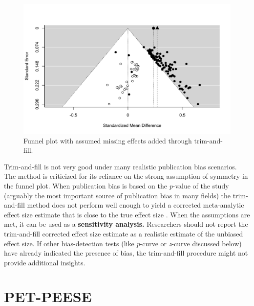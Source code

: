 \documentclass[
  oneside]{krantz}
\begin{document}
\begin{figure}

{\centering \includegraphics[width=1\linewidth]{12-bias_files/figure-latex/trimfill1-1} 

}

\caption{Funnel plot with assumed missing effects added through trim-and-fill.}\label{fig:trimfill1}
\end{figure}

Trim-and-fill is not very good under many realistic publication bias scenarios. The method is criticized for its reliance on the strong assumption of symmetry in the funnel plot. When publication bias is based on the \emph{p}-value of the study (arguably the most important source of publication bias in many fields) the trim-and-fill method does not perform well enough to yield a corrected meta-analytic effect size estimate that is close to the true effect size \citep{peters_performance_2007, terrin_adjusting_2003}. When the assumptions are met, it can be used as a \textbf{sensitivity analysis.} Researchers should not report the trim-and-fill corrected effect size estimate as a realistic estimate of the unbiased effect size. If other bias-detection tests (like \emph{p}-curve or \emph{z}-curve discussed below) have already indicated the presence of bias, the trim-and-fill procedure might not provide additional insights.

\hypertarget{pet-peese}{%
\section{PET-PEESE}\label{pet-peese}}
\end{document}
